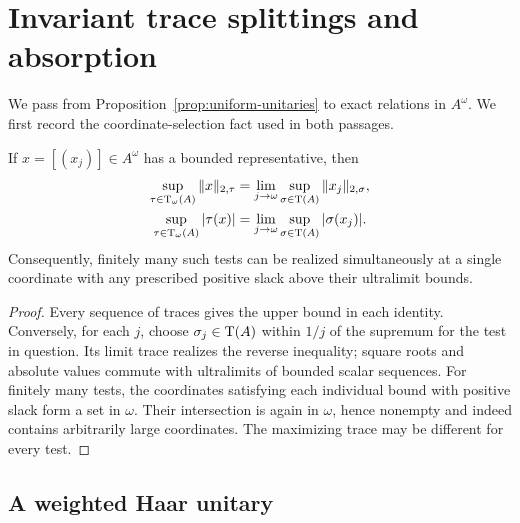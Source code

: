 \section{Invariant trace splittings and absorption}\label{sec:splittings}

We pass from Proposition~\ref{prop:uniform-unitaries} to exact
relations in \(A^\omega\). We first record the coordinate-selection
fact used in both passages.

\begin{lemma}\label{lem:coordinate}
If \(x=[(x_j)]\in A^\omega\) has a bounded representative, then
\begin{align}
 \sup_{\tau\in\operatorname{T}_\omega(A)}\|x\|_{2,\tau}
   &=\lim_{j\to\omega}\sup_{\sigma\in\operatorname{T}(A)}\|x_j\|_{2,\sigma},
       \label{eq:coordinate-two}\\
 \sup_{\tau\in\operatorname{T}_\omega(A)}|\tau(x)|
   &=\lim_{j\to\omega}\sup_{\sigma\in\operatorname{T}(A)}|\sigma(x_j)|.
       \label{eq:coordinate-trace}
\end{align}
Consequently, finitely many such tests can be realized simultaneously
at a single coordinate with any prescribed positive slack above their
ultralimit bounds.
\end{lemma}

\begin{proof}
Every sequence of traces gives the upper bound in each identity.
Conversely, for each \(j\), choose \(\sigma_j\in\operatorname{T}(A)\)
within \(1/j\) of the supremum for the test in question.
Its limit trace realizes the reverse inequality; square roots and
absolute values commute with ultralimits of bounded scalar sequences.
For finitely many tests, the coordinates satisfying each individual
bound with positive slack form a set in \(\omega\). Their intersection
is again in \(\omega\), hence nonempty and indeed contains arbitrarily
large coordinates. The maximizing trace may be different for every test.
\end{proof}

\subsection{A weighted Haar unitary}


